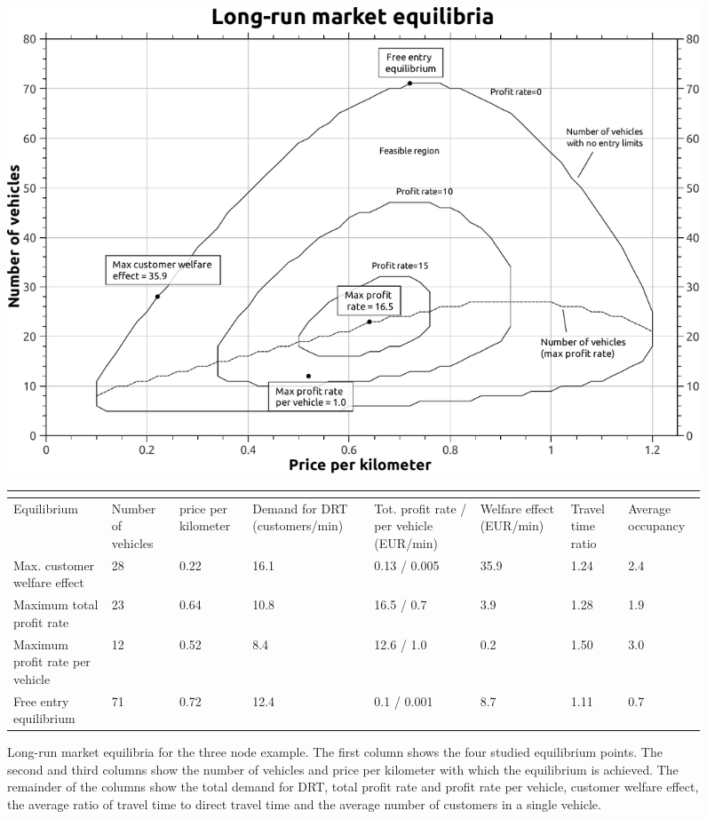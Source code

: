 \documentclass[dissertation,draft*]{aaltoseries}
\begin{document}
\begin{figure}[ht]
\begin{center}
\includegraphics[width=0.9\columnwidth]{a-equilibria01}
\\
{\scriptsize
\begin{tabular}{|p{2.0cm}|p{1.0cm}|p{1.0cm}|p{1.5cm}|p{1.4cm}|p{1.2cm}|p{0.75cm}|p{0.9cm}|}
\multicolumn{8}{c}{} \\
\hline
Equilibrium & Number of vehicles & price per kilometer & Demand for DRT (customers/min) & 
Tot. profit rate / per vehicle (EUR/min) & Welfare effect (EUR/min) & Travel time ratio & Average occupancy \\
\hline
Max. customer welfare effect & 28 & 0.22 & 16.1 & 0.13 / 0.005 & 35.9 & 1.24 & 2.4 \\
\hline
Maximum total profit rate & 23 & 0.64 & 10.8 & 16.5 / 0.7 & 3.9 & 1.28 & 1.9 \\
\hline
Maximum profit rate per vehicle & 12 & 0.52 & 8.4 & 12.6 / 1.0 & 0.2 & 1.50 & 3.0 \\
\hline
Free entry equilibrium & 71 & 0.72 & 12.4 & 0.1 / 0.001 & 8.7 & 1.11 & 0.7 \\
\hline
\end{tabular}
}
\caption{Long-run market equilibria for the three node example. The first column shows the
four studied equilibrium points. The second and third columns show the 
number of vehicles and price per kilometer with which the equilibrium is achieved.
The remainder of the columns show the total demand for DRT, total profit rate and profit rate
per vehicle, customer welfare effect, the average ratio of travel time to direct travel time
and the average number of customers in a single vehicle.}
\label{a-equilibria01}
\end{center}
\end{figure}
\end{document}
